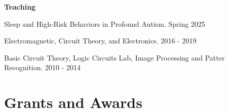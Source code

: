 \documentclass[margin, line]{res}
\newenvironment{list1}{
  \begin{list}{\ding{113}}{%
      \setlength{\itemsep}{0in}
      \setlength{\parsep}{0in} \setlength{\parskip}{0in}
      \setlength{\topsep}{0in} \setlength{\partopsep}{0in} 
      \setlength{\leftmargin}{0.17in}}}{\end{list}}
\begin{document}
\begin{resume}
\begin{list1}
\begin{itemize}


\end{itemize}



\item[] \textbf{Teaching} 
    \item[] Sleep and High‑Risk Behaviors in Profound Autism. \hspace*{\fill} Spring 2025
    \item[] Electromagnetic, Circuit Theory, and Electronics.\hspace*{\fill} 2016 - 2019
    \item[] Basic Circuit Theory, Logic Circuits Lab, Image Processing and Patter Recognition.\hspace*{\fill} 2010 - 2014


\end{list1}

\section{\sc \textbf{\large{Grants and Awards}}}


\end{resume}
\end{document}
